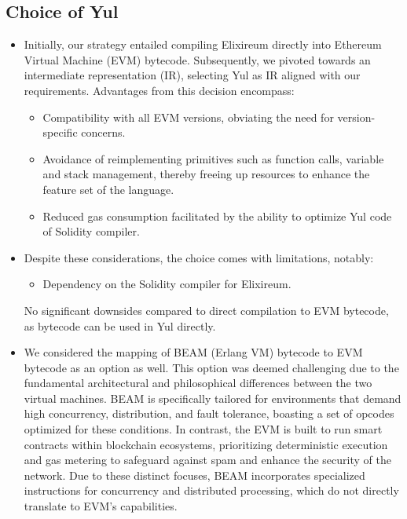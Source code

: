\subsection{Choice of Yul}
\begin{itemize}
    \item Initially, our strategy entailed compiling Elixireum directly into Ethereum Virtual Machine (EVM) bytecode. Subsequently, we pivoted towards an intermediate representation (IR), selecting Yul as IR aligned with our requirements. Advantages from this decision encompass:
          \begin{itemize}
              \item Compatibility with all EVM versions, obviating the need for version-specific concerns.
              \item Avoidance of reimplementing primitives such as function calls, variable and stack management, thereby freeing up resources to enhance the feature set of the language.
              \item Reduced gas consumption facilitated by the ability to optimize Yul code of Solidity compiler.
          \end{itemize}
    \item Despite these considerations, the choice comes with limitations, notably:
          \begin{itemize}
              \item Dependency on the Solidity compiler for Elixireum.
          \end{itemize}

          No significant downsides compared to direct compilation to EVM bytecode, as bytecode can be used in Yul directly.
    \item We considered the mapping of BEAM (Erlang VM) bytecode to EVM bytecode as an option as well. This option was deemed challenging due to the fundamental architectural and philosophical differences between the two virtual machines. BEAM is specifically tailored for environments that demand high concurrency, distribution, and fault tolerance, boasting a set of opcodes optimized for these conditions. In contrast, the EVM is built to run smart contracts within blockchain ecosystems, prioritizing deterministic execution and gas metering to safeguard against spam and enhance the security of the network. Due to these distinct focuses, BEAM incorporates specialized instructions for concurrency and distributed processing, which do not directly translate to EVM's capabilities.
\end{itemize}


